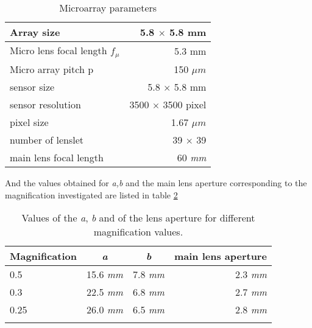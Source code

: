 \begin{table}
	\centering
	\begin{tabular}{l|r}
	
		
		Array size & 5.8 $\times$  5.8 mm\\ \hline
		Micro lens focal length $f_{\mu}$ & 5.3 mm \\ \hline
		Micro array pitch p & 150 $\mu m$ \\ \hline
		sensor size & 5.8 $\times$  5.8 mm\\ \hline
		sensor resolution & 3500 $\times$  3500 pixel \\ \hline
		pixel size & 1.67 $\mu m$ \\ \hline
		number of lenslet & 39 $\times$ 39  \\ \hline
		main lens focal length & 60 \textit{mm}
		\label{tab:4}
	\end{tabular}
	\caption{\label{tab:2} Microarray parameters}
\end{table}
And the values obtained for \textit{a,b} and the main lens aperture corresponding to the magnification investigated are listed in table \ref{tab:3}
\\
\begin{table}
	\centering
\begin{tabular}{l|c|c|r}
	
	Magnification & \textit{a} & \textit{b} & main lens aperture\\ \hline
	0.5 & 15.6 \textit{mm} &  7.8 \textit{mm} & 2.3 \textit{mm}\\ \hline
    0.3 & 22.5 \textit{mm} &  6.8 \textit{mm} & 2.7 \textit{mm}\\ \hline
   	0.25 & 26.0 \textit{mm} &  6.5 \textit{mm} & 2.8 \textit{mm}\\ 
  	\label{tab:3}
\end{tabular}
\caption{\label{tab:3} Values of the \textit{a}, \textit{b} and of the lens aperture for different magnification values. }
\end{table}

